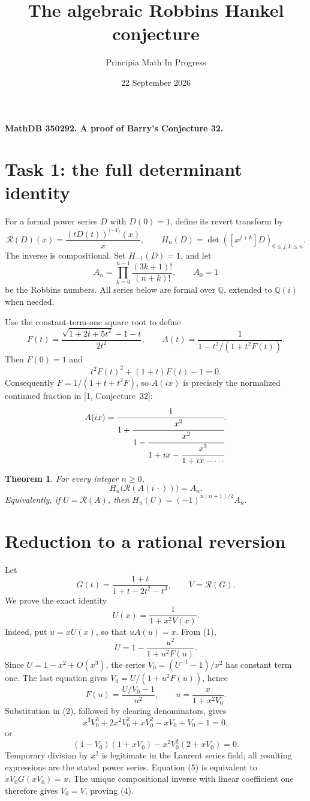 \documentclass[11pt]{article}
\title{The algebraic Robbins Hankel conjecture}
\author{Principia Math In Progress}
\date{22 September 2026}
\newtheorem{theorem}{Theorem}
\newcommand{\rev}{\mathcal R}
\begin{document}
\maketitle
\noindent\textbf{MathDB 350292. A proof of Barry's Conjecture 32.}

\section*{Task 1: the full determinant identity}
For a formal power series \(D\) with \(D(0)=1\), define its
revert transform by
\[
 \rev(D)(x)=\frac{(tD(t))^{\langle-1\rangle}(x)}x,
 \qquad H_n(D)=\det([x^{j+k}]D)_{0\le j,k\le n}.
\]
The inverse is compositional. Set \(H_{-1}(D)=1\), and let
\[
 A_n=\prod_{k=0}^{n-1}\frac{(3k+1)!}{(n+k)!},\qquad A_0=1
\]
be the Robbins numbers. All series below are formal over
\(\mathbb Q\), extended to \(\mathbb Q(i)\) when needed.

Use the constant-term-one square root to define
\[
 F(t)=\frac{\sqrt{1+2t+5t^2}-1-t}{2t^2},\qquad
 A(t)=\frac1{1-t^2/(1+t^2F(t))}.                       \tag{1}
\]
Then \(F(0)=1\) and
\[
 t^2F(t)^2+(1+t)F(t)-1=0.                             \tag{2}
\]
Consequently \(F=1/(1+t+t^2F)\), so \(A(ix)\) is precisely
the normalized continued fraction in [1, Conjecture~32]:
\[
 A(ix)=\cfrac1{1+\cfrac{x^2}{1-\cfrac{x^2}{1+ix-
              \cfrac{x^2}{1+ix-\cdots}}}}.
\]

\begin{theorem}
For every integer \(n\ge0\),
\[
 \boxed{\displaystyle H_n\bigl(\rev(A(i\,\cdot))\bigr)=A_n.} \tag{3}
\]
Equivalently, if \(U=\rev(A)\), then
\(H_n(U)=(-1)^{n(n+1)/2}A_n\).
\end{theorem}

\section*{Reduction to a rational reversion}
Let
\[
 G(t)=\frac{1+t}{1+t-2t^2-t^3},\qquad V=\rev(G).
\]
We prove the exact identity
\[
                         U(x)=\frac1{1+x^2V(x)}.       \tag{4}
\]
Indeed, put \(u=xU(x)\), so that \(uA(u)=x\). From (1),
\[
 U=1-\frac{u^2}{1+u^2F(u)}.
\]
Since \(U=1-x^2+O(x^3)\), the series
\(V_0=(U^{-1}-1)/x^2\) has constant term one. The last equation
gives \(V_0=U/(1+u^2F(u))\), hence
\[
 F(u)=\frac{U/V_0-1}{u^2},\qquad
 u=\frac{x}{1+x^2V_0}.
\]
Substitution in (2), followed by clearing denominators, gives
\[
 x^3V_0^3+2x^2V_0^2+xV_0^2-xV_0+V_0-1=0,
\]
or
\[
 (1-V_0)(1+xV_0)-x^2V_0^2(2+xV_0)=0.                \tag{5}
\]
Temporary division by \(x^2\) is legitimate in the Laurent
series field; all resulting expressions are the stated power
series. Equation (5) is equivalent to
\(xV_0G(xV_0)=x\). The unique compositional inverse with linear
coefficient one therefore gives \(V_0=V\), proving (4).
\end{document}
